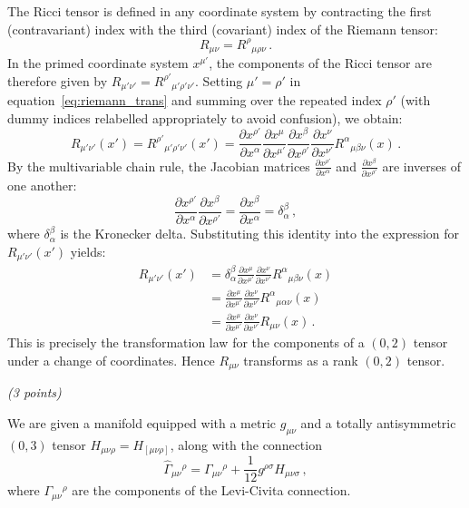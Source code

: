 \documentclass[12pt]{article}
\newcommand{\be}{\begin{equation}}
\newcommand{\ee}{\end{equation}}
\newcounter{quesno}
\newcommand{\ques}[1]{\vspace{2.5em}\stepcounter{quesno}
\noindent{\bf\large Question \thequesno.} \emph{(#1 points)}\par\vspace{0.5em}
}
\begin{document}
The Ricci tensor is defined in any coordinate system by contracting the first (contravariant) index with the third (covariant) index of the Riemann tensor:
\be
R_{\mu\nu} = R^\rho{}_{\mu\rho\nu} \,.
\ee
In the primed coordinate system $x^{\mu'}$, the components of the Ricci tensor are therefore given by $R_{\mu'\nu'} = R^{\rho'}{}_{\mu'\rho'\nu'}$. Setting $\mu' = \rho'$ in equation~\eqref{eq:riemann_trans} and summing over the repeated index $\rho'$ (with dummy indices relabelled appropriately to avoid confusion), we obtain:
\be
R_{\mu'\nu'}(x') = R^{\rho'}{}_{\mu'\rho'\nu'}(x') = \frac{\partial x^{\rho'}}{\partial x^\alpha} \frac{\partial x^\mu}{\partial x^{\mu'}} \frac{\partial x^\beta}{\partial x^{\rho'}} \frac{\partial x^\nu}{\partial x^{\nu'}} R^\alpha{}_{\mu\beta\nu}(x) \,.
\ee
By the multivariable chain rule, the Jacobian matrices $\frac{\partial x^{\rho'}}{\partial x^\alpha}$ and $\frac{\partial x^\beta}{\partial x^{\rho'}}$ are inverses of one another:
\be
\frac{\partial x^{\rho'}}{\partial x^\alpha} \frac{\partial x^\beta}{\partial x^{\rho'}} = \frac{\partial x^\beta}{\partial x^\alpha} = \delta^\beta_\alpha \,,
\ee
where $\delta^\beta_\alpha$ is the Kronecker delta. Substituting this identity into the expression for $R_{\mu'\nu'}(x')$ yields:
\begin{align}
R_{\mu'\nu'}(x') &= \delta^\beta_\alpha \frac{\partial x^\mu}{\partial x^{\mu'}} \frac{\partial x^\nu}{\partial x^{\nu'}} R^\alpha{}_{\mu\beta\nu}(x) \nonumber \\
&= \frac{\partial x^\mu}{\partial x^{\mu'}} \frac{\partial x^\nu}{\partial x^{\nu'}} R^\alpha{}_{\mu\alpha\nu}(x) \nonumber \\
&= \frac{\partial x^\mu}{\partial x^{\mu'}} \frac{\partial x^\nu}{\partial x^{\nu'}} R_{\mu\nu}(x) \,.
\end{align}
This is precisely the transformation law for the components of a $(0,2)$ tensor under a change of coordinates. Hence $R_{\mu\nu}$ transforms as a rank $(0,2)$ tensor.


\ques{3}
We are given a manifold equipped with a metric $g_{\mu\nu}$ and a totally antisymmetric $(0,3)$ tensor $H_{\mu\nu\rho} = H_{[\mu\nu\rho]}$, along with the connection
\be
\hat \Gamma_{\mu\nu}{}^\rho = \Gamma_{\mu\nu}{}^\rho + \frac{1}{12} g^{\rho \sigma} H_{\mu\nu\sigma} \,,
\label{eq:stringconn_ans}
\ee
where $\Gamma_{\mu\nu}{}^\rho$ are the components of the Levi-Civita connection.
\end{document}
